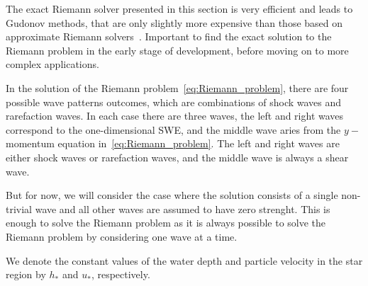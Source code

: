 The exact Riemann solver presented in this section is very efficient and leads to Gudonov methods, that are only slightly more expensive than those based on approximate Riemann solvers~\cite{Toro2001-Shock}.
Important to find the exact solution to the Riemann problem in the early stage of development, before moving on to more complex applications.


In the solution of the Riemann problem~\eqref{eq:Riemann_problem}, there are four possible wave patterns outcomes, which are combinations of shock waves and rarefaction waves.
In each case there are three waves, the left and right waves correspond to the one-dimensional SWE, and the middle wave aries from the $y-$momentum equation in~\eqref{eq:Riemann_problem}.
The left and right waves are either shock waves or rarefaction waves, and the middle wave is always a shear wave.

But for now, we will consider the case where the solution consists of a single non-trivial wave and all other waves are assumed to have zero strenght.
This is enough to solve the Riemann problem as it is always possible to solve the Riemann problem by considering one wave at a time.

We denote the constant values of the water depth and particle velocity in the star region by $h_*$ and $u_*$, respectively.

